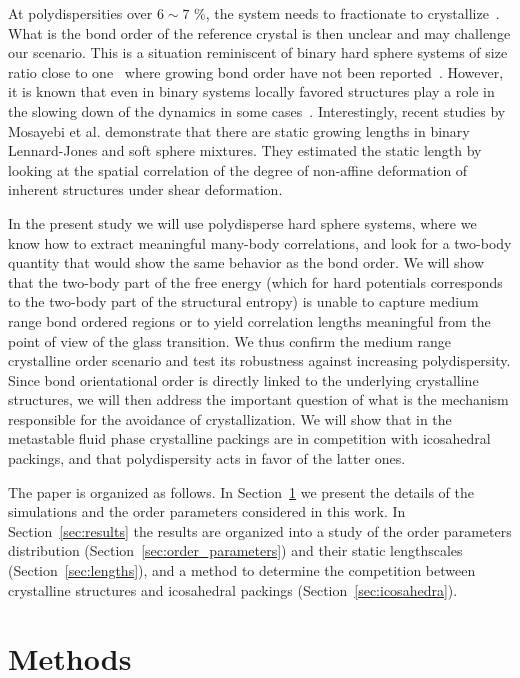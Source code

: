 \documentclass[twocolumn,superscriptaddress]{revtex4}
\begin{document}
At polydispersities over $6 \sim 7$ \%, the system needs to fractionate to crystallize~\citep{Fasolo2003}. What is the bond order of the reference crystal is then unclear and may challenge our scenario. This is a situation reminiscent of binary hard sphere systems of size ratio close to one~\cite{Hopkins2011b,Hopkins2012} where growing bond order have not been reported~\cite{Charbonneau}. However, it is known that even in binary systems locally favored structures play a role in the slowing down of the dynamics in some cases~\cite{Coslovich2011,Malins2012}. Interestingly, recent studies by Mosayebi et al. \cite{mosayebi2010,mosayebi2012} demonstrate that there are static growing lengths 
in binary Lennard-Jones and soft sphere mixtures. They estimated the static length by looking at the spatial correlation of the degree of non-affine deformation 
of inherent structures under shear deformation. 

In the present study we will use polydisperse hard sphere systems, where we know how to extract meaningful many-body correlations, and look for a two-body quantity that would show the same behavior as the bond order. We will show that the two-body part of the free energy (which for hard potentials corresponds to the two-body part of the structural entropy) is unable to capture medium range bond ordered regions or to yield correlation lengths meaningful from the point of view of the glass transition. We thus confirm the medium range crystalline order scenario and test its robustness against increasing polydispersity.
Since bond orientational order is directly linked to the underlying crystalline structures, we will then address the important question
of what is the mechanism responsible for the avoidance of crystallization. We will show that in the metastable fluid phase crystalline packings
are in competition with icosahedral packings, and that polydispersity acts in favor of the latter ones.

The paper is organized as follows. In Section~\ref{sec:methods} we present the details of the simulations and the order parameters considered in this work. In Section~\ref{sec:results} the results are organized into
a study of the order parameters distribution (Section~\ref{sec:order_parameters}) and their static lengthscales (Section~\ref{sec:lengths}), and a method to determine the competition between crystalline structures
and icosahedral packings (Section~\ref{sec:icosahedra}).

\section{Methods}\label{sec:methods}
\end{document}
